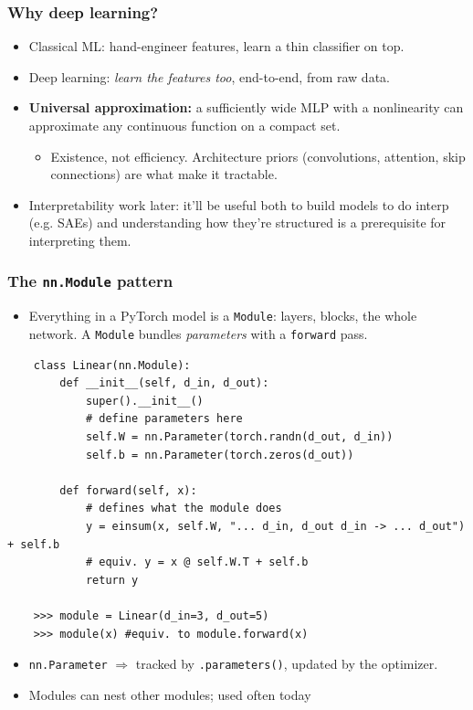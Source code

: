 \begin{frame}
\frametitle{Why deep learning?}
\begin{itemize}
    \item Classical ML: hand-engineer features,
    learn a thin classifier on top.
    \pause
    \item Deep learning: \textit{learn the features too}, end-to-end, from raw data.
    \pause
    \item \textbf{Universal approximation:} a sufficiently wide MLP with a
    nonlinearity can approximate any continuous function on a compact set.
    \begin{itemize}
        \item Existence, not efficiency. Architecture priors (convolutions,
        attention, skip connections) are what make it tractable.
    \end{itemize}
    \pause
    \item Interpretability work later: it'll be useful both to build models to do interp (e.g. SAEs) and understanding how they're structured is a prerequisite for interpreting them.
\end{itemize}
\end{frame}

\begin{frame}[fragile]
\frametitle{The \texttt{nn.Module} pattern}
\begin{itemize}
    \item Everything in a PyTorch model is a \texttt{Module}: layers, blocks,
    the whole network. A \texttt{Module} bundles \textit{parameters} with a
    \texttt{forward} pass.
    \pause
\end{itemize}
\begin{block}{}
\begin{lstlisting}
    class Linear(nn.Module):
        def __init__(self, d_in, d_out):
            super().__init__()
            # define parameters here
            self.W = nn.Parameter(torch.randn(d_out, d_in))
            self.b = nn.Parameter(torch.zeros(d_out))

        def forward(self, x):
            # defines what the module does
            y = einsum(x, self.W, "... d_in, d_out d_in -> ... d_out") + self.b
            # equiv. y = x @ self.W.T + self.b
            return y

    >>> module = Linear(d_in=3, d_out=5)
    >>> module(x) #equiv. to module.forward(x)
\end{lstlisting}
\end{block}
\pause
\begin{itemize}
    \item \texttt{nn.Parameter} $\Rightarrow$ tracked by \texttt{.parameters()},
    updated by the optimizer.
    \pause
    \item Modules can nest other modules; used often today
\end{itemize}
\end{frame}

